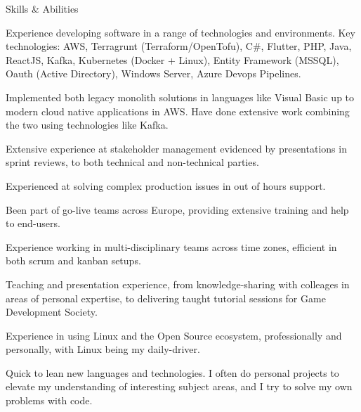 \documentclass[
	a4paper,
	12pt,
]{resume}
\begin{document}
\begin{rSection}{Skills \& Abilities}

\begin{rListsection}
\item Experience developing software in a range of technologies and environments. Key technologies: AWS, Terragrunt (Terraform/OpenTofu), C\#, Flutter, PHP, Java, ReactJS, Kafka, Kubernetes (Docker + Linux), Entity Framework (MSSQL), Oauth (Active Directory), Windows Server, Azure Devops Pipelines.
\item Implemented both legacy monolith solutions in languages like Visual Basic up to modern cloud native applications in AWS. Have done extensive work combining the two using technologies like Kafka. 
\item Extensive experience at stakeholder management evidenced by presentations in sprint reviews, to both technical and non-technical parties.
\item Experienced at solving complex production issues in out of hours support.
\item Been part of go-live teams across Europe, providing extensive training and help to end-users.
\item Experience working in multi-disciplinary teams across time zones, efficient in both scrum and kanban setups.
\item Teaching and presentation experience, from knowledge-sharing with colleages in areas of personal expertise, to delivering taught tutorial sessions for Game Development Society.
\item Experience in using Linux and the Open Source ecosystem, professionally and personally, with Linux being my daily-driver.
\item Quick to lean new languages and technologies. I often do personal projects to elevate my understanding of interesting subject areas, and I try to solve my own problems with code.
\end{rListsection}

\end{rSection}
\end{document}
